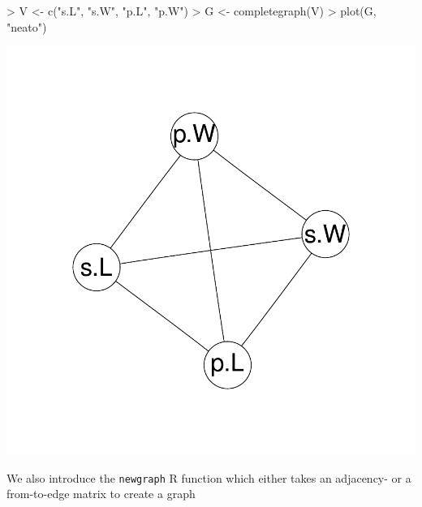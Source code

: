 \documentclass[12pt,oneside,titlepage,letter]{article}
\begin{document}
\begin{center}
\begin{Schunk}
\begin{Sinput}
> V <- c("s.L", "s.W", "p.L", "p.W")
> G <- completegraph(V)
> plot(G, "neato")
\end{Sinput}
\end{Schunk}
\includegraphics{sweave_p-032}
\end{center}

We also introduce the \texttt{newgraph} R function which either takes an adjacency- or a from-to-edge matrix to create a graph
\end{document}
